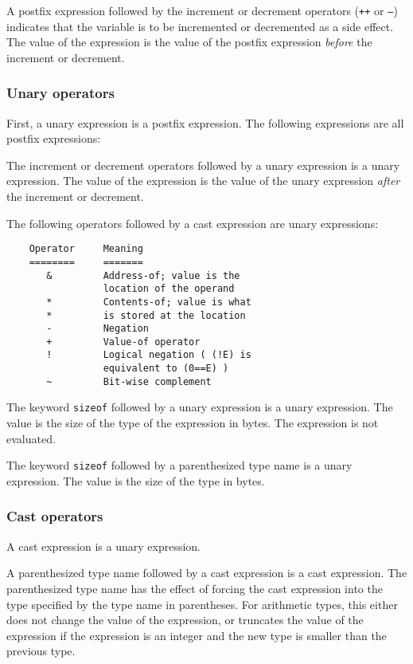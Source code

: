 A postfix expression followed by the increment or decrement operators
(\texttt{++} or \texttt{--}) indicates that the variable is to be incremented
or decremented as a side effect. The value of the expression is the value of
the postfix expression \emph{before} the increment or decrement.

\subsubsection{Unary operators}

First, a unary expression is a postfix expression. The following expressions
are all postfix expressions:

The increment or decrement operators followed by a unary expression is a unary
expression. The value of the expression is the value of the unary expression
\emph{after} the increment or decrement.

The following operators followed by a cast expression are unary expressions:
\begin{verbatim}
	Operator     Meaning
	========     =======
	   &         Address-of; value is the 
				 location of the operand
	   *         Contents-of; value is what 
	   *         is stored at the location
	   -         Negation
	   +         Value-of operator
	   !         Logical negation ( (!E) is 
				 equivalent to (0==E) )
	   ~         Bit-wise complement
\end{verbatim}

The keyword \texttt{sizeof} followed by a unary expression is a unary
expression. The value is the size of the type of the expression in bytes. The
expression is not evaluated.

The keyword \texttt{sizeof} followed by a parenthesized type name is a unary
expression. The value is the size of the type in bytes.

\subsubsection{Cast operators}
A cast expression is a unary expression.

A parenthesized type name followed by a cast expression is a cast expression.
The parenthesized type name has the effect of forcing the cast expression into
the type specified by the type name in parentheses. For arithmetic types, this
either does not change the value of the expression, or truncates the value of
the expression if the expression is an integer and the new type is smaller than
the previous type.

